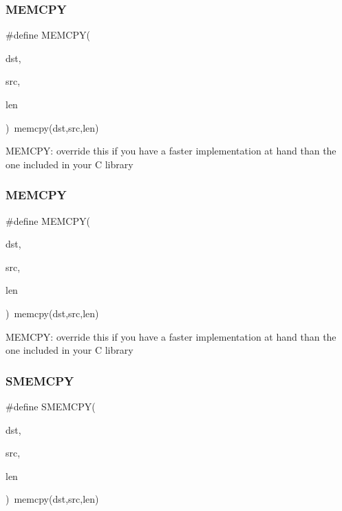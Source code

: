 \subsubsection{\texorpdfstring{M\+E\+M\+C\+PY}{MEMCPY}\hspace{0.1cm}{\footnotesize\ttfamily [1/2]}}
{\footnotesize\ttfamily \#define M\+E\+M\+C\+PY(\begin{DoxyParamCaption}\item[{}]{dst,  }\item[{}]{src,  }\item[{}]{len }\end{DoxyParamCaption})~memcpy(dst,src,len)}

M\+E\+M\+C\+PY\+: override this if you have a faster implementation at hand than the one included in your C library \mbox{\label{group__lwip__opts__memcpy_gaa1dd57a66b6de8c0593e9e3e8d1411f6}} 
\subsubsection{\texorpdfstring{M\+E\+M\+C\+PY}{MEMCPY}\hspace{0.1cm}{\footnotesize\ttfamily [2/2]}}
{\footnotesize\ttfamily \#define M\+E\+M\+C\+PY(\begin{DoxyParamCaption}\item[{}]{dst,  }\item[{}]{src,  }\item[{}]{len }\end{DoxyParamCaption})~memcpy(dst,src,len)}

M\+E\+M\+C\+PY\+: override this if you have a faster implementation at hand than the one included in your C library \mbox{\label{group__lwip__opts__memcpy_ga8c6e3c1e4f74acb16376188dbf8909ec}} 
\subsubsection{\texorpdfstring{S\+M\+E\+M\+C\+PY}{SMEMCPY}\hspace{0.1cm}{\footnotesize\ttfamily [1/2]}}
{\footnotesize\ttfamily \#define S\+M\+E\+M\+C\+PY(\begin{DoxyParamCaption}\item[{}]{dst,  }\item[{}]{src,  }\item[{}]{len }\end{DoxyParamCaption})~memcpy(dst,src,len)}

